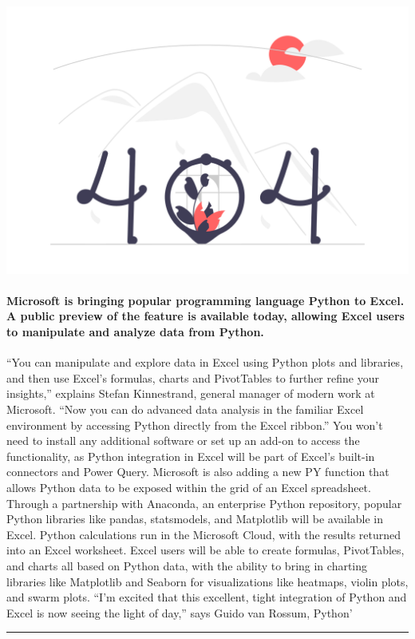\documentclass[10pt,a4paper]{article}
\begin{document}
\begin{minipage}[t]{0.80\linewidth}
\vspace{0pt}
\begin{multicols}{2}

    \href{https://www.theverge.com/2023/8/22/23841167/microsoft-excel-python-integration-support?utm\_source=hackernewsletter\&utm\_medium=email\&utm\_term=fav}{
        \includegraphics[width=0.99\linewidth]{notfound.png}
    }
  
\paragraph{Microsoft is bringing popular programming language Python to Excel. A public preview of the feature is available today, allowing Excel users to manipulate and analyze data from Python.}

“You can manipulate and explore data in Excel using Python plots and libraries, and then use Excel’s formulas, charts and PivotTables to further refine your insights,” explains Stefan Kinnestrand, general manager of modern work at Microsoft. “Now you can do advanced data analysis in the familiar Excel environment by accessing Python directly from the Excel ribbon.”
You won’t need to install any additional software or set up an add-on to access the functionality, as Python integration in Excel will be part of Excel’s built-in connectors and Power Query. Microsoft is also adding a new PY function that allows Python data to be exposed within the grid of an Excel spreadsheet. Through a partnership with Anaconda, an enterprise Python repository, popular Python libraries like pandas, statsmodels, and Matplotlib will be available in Excel.
Python calculations run in the Microsoft Cloud, with the results returned into an Excel worksheet. Excel users will be able to create formulas, PivotTables, and charts all based on Python data, with the ability to bring in charting libraries like Matplotlib and Seaborn for visualizations like heatmaps, violin plots, and swarm plots.
“I’m excited that this excellent, tight integration of Python and Excel is now seeing the light of day,” says Guido van Rossum, Python’

\end{multicols}
\end{minipage}
\par\medskip
\noindent\textcolor{red}{\rule{\linewidth}{0.2mm}}
\end{document}
